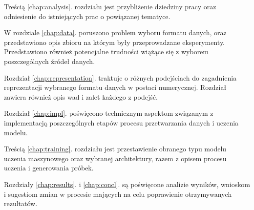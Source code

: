 {{        Treścią \ref{chap:analysis}. rozdziału jest przybliżenie dziedziny pracy oraz odniesienie do istniejących prac o\,\,powiązanej tematyce.
        
        W\,\,rozdziale \ref{chap:data}. poruszono problem wyboru formatu danych, oraz przedstawiono opis zbioru na którym
        były przeprowadzane eksperymenty. Przedstawiono również potencjalne trudności wiążące się z\,\,wyborem
        poszczególnych źródeł danych.

        Rozdział \ref{chap:representation}. traktuje o\,\,różnych podejściach do zagadnienia reprezentacji wybranego formatu 
        danych w\,\,postaci numerycznej. Rozdział zawiera również opis wad i\,\,zalet każdego z\,\,podejść.

        Rozdział \ref{chap:impl}. poświęcono technicznym aspektom związanym z implementacją poszczególnych etapów procesu 
        przetwarzania danych i uczenia modelu.
        
        Treścią \ref{chap:training}. rozdziału jest przestawienie obranego typu modelu uczenia maszynowego oraz 
        wybranej architektury, razem z\,\,opisem procesu uczenia i generowania próbek.

        Rozdziały \ref{chap:results}. i\,\,\ref{chap:concl}. są poświęcone analizie wyników, wnioskom i\,\,sugestiom zmian w\,\,procesie mających na celu 
        poprawienie otrzymywanych rezultatów.
    }
}


